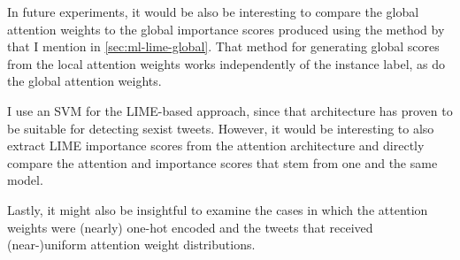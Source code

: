 In future experiments, it would be also be interesting to compare the global attention weights to the global importance scores produced using the method by \citet{ribeiro2016lime} that I mention in \autoref{sec:ml-lime-global}.
That method for generating global scores from the local attention weights works independently of the instance label, as do the global attention weights.

I use an SVM for the LIME-based approach, since that architecture has proven to be suitable for detecting sexist tweets.
However, it would be interesting to also extract LIME importance scores from the attention architecture and directly compare the attention and importance scores that stem from one and the same model.

Lastly, it might also be insightful to examine the cases in which the attention weights were (nearly) one-hot encoded and the tweets that received (near-)uniform attention weight distributions.


